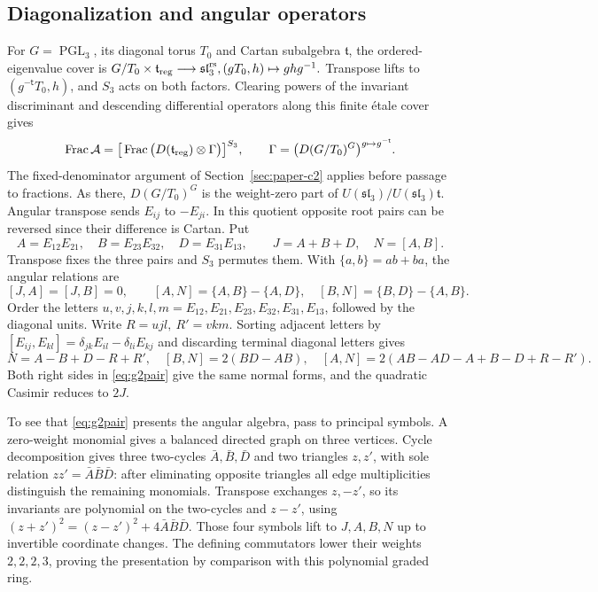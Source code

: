 \documentclass[11pt,a4paper]{article}
\theoremstyle{definition}
\begin{document}
\subsection{Diagonalization and angular operators}
For \(G=\operatorname{PGL}_3\), its diagonal torus \(T_0\) and Cartan subalgebra \(\mathfrak t\), the ordered-eigenvalue cover is
\(
 G/T_0\times\mathfrak t_{\rm reg}\longrightarrow\mathfrak{sl}_3^{\rm rs},
 (gT_0,h)\mapsto ghg^{-1}.
\)
Transpose lifts to \((g^{-\mathsf t}T_0,h)\), and \(S_3\) acts on both factors. Clearing powers of the invariant discriminant and descending differential operators along this finite étale cover gives
\begin{equation}\label{eq:g2cover}
 \operatorname{Frac}\mathcal A
 =\big[\operatorname{Frac}\big(D(\mathfrak t_{\rm reg})\otimes\Gamma\big)\big]^{S_3},
 \qquad \Gamma=\big(D(G/T_0)^G\big)^{g\mapsto g^{-\mathsf t}} .
\end{equation}
The fixed-denominator argument of Section~\ref{sec:paper-c2} applies before passage to fractions. As there, \(D(G/T_0)^G\) is the weight-zero part of \(U(\mathfrak{sl}_3)/U(\mathfrak{sl}_3)\mathfrak t\). Angular transpose sends \(E_{ij}\) to \(-E_{ji}\). In this quotient opposite root pairs can be reversed since their difference is Cartan. Put
\[
 A=E_{12}E_{21},\quad B=E_{23}E_{32},\quad D=E_{31}E_{13},\qquad
 J=A+B+D,\quad N=[A,B].
\]
Transpose fixes the three pairs and \(S_3\) permutes them. With \(\{a,b\}=ab+ba\), the angular relations are
\begin{equation}\label{eq:g2pair}
 [J,A]=[J,B]=0,\qquad [A,N]=\{A,B\}-\{A,D\},\quad
 [B,N]=\{B,D\}-\{A,B\}.
\end{equation}
Order the letters \(u,v,j,k,l,m=E_{12},E_{21},E_{23},E_{32},E_{31},E_{13}\), followed by the diagonal units. Write \(R=ujl,\ R'=vkm\). Sorting adjacent letters by \([E_{ij},E_{kl}]=\delta_{jk}E_{il}-\delta_{li}E_{kj}\) and discarding terminal diagonal letters gives
\[
 N=A-B+D-R+R',\quad [B,N]=2(BD-AB),\quad
 [A,N]=2(AB-AD-A+B-D+R-R').
\]
Both right sides in \eqref{eq:g2pair} give the same normal forms, and the quadratic Casimir reduces to \(2J\).

To see that \eqref{eq:g2pair} presents the angular algebra, pass to principal symbols. A zero-weight monomial gives a balanced directed graph on three vertices. Cycle decomposition gives three two-cycles \(\bar A,\bar B,\bar D\) and two triangles \(z,z'\), with sole relation \(zz'=\bar A\bar B\bar D\): after eliminating opposite triangles all edge multiplicities distinguish the remaining monomials. Transpose exchanges \(z,-z'\), so its invariants are polynomial on the two-cycles and \(z-z'\), using \((z+z')^2=(z-z')^2+4\bar A\bar B\bar D\). Those four symbols lift to \(J,A,B,N\) up to invertible coordinate changes. The defining commutators lower their weights \(2,2,2,3\), proving the presentation by comparison with this polynomial graded ring.
\end{document}

